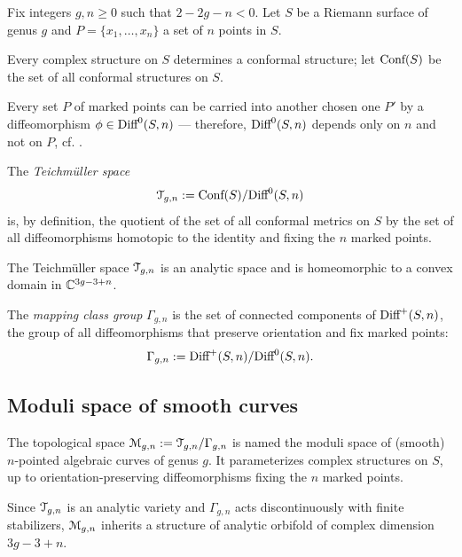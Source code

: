 Fix integers $g,n\geq0$ such that $2 -2g - n < 0$. Let $S$ be a Riemann
surface of genus $g$ and $P = \{ x_1, \ldots, x_n \}$ a set of $n$ points
in $S$.

Every complex structure  on $S$ determines a conformal structure; let
$\text{\rm Conf}(S)$ be the set of all conformal structures on $S$. 

Every set $P$ of marked points can be carried into another chosen one
$P'$ by a diffeomorphism $\phi \in \textrm{Diff}^0(S, n)$ --- therefore,
$\textrm{Diff}^0(S, n)$ depends only on $n$ and not on $P$, cf.
\cite{krushkal;riemann-surfaces}. 
\begin{definition}\label{dfn:teichmuller}
  The \emph{Teichm{\"u}ller space}
  \begin{equation*}
    \mathcal{T}_{g,n} := \text{\rm Conf}(S) / \textrm{Diff}^0(S, n)
  \end{equation*}
  is, by definition, the quotient of the set of all conformal metrics on
  $S$ by the set of all diffeomorphisms homotopic to the identity and
  fixing the $n$ marked points.
\end{definition}
The Teichm{\"u}ller space $\mathcal{T}_{g,n}$ is an analytic space and is
homeomorphic to a convex domain in $\mathbb{C}^{3g - 3 + n}$.

\begin{definition}\label{dfn:mapping-class-group}
  The \emph{mapping class group} $\Gamma_{g,n}$ is the set of connected
  components of $\textrm{Diff}^+(S, n)$, the group of all diffeomorphisms that
  preserve orientation and fix marked points:
  \begin{equation*}
    \Gamma_{g,n} := \textrm{Diff}^+ (S, n) / \textrm{Diff}^0(S, n).
  \end{equation*}
\end{definition}


\subsection{Moduli space of smooth curves}
\label{sec:Mgn}

\begin{definition}
  The topological space $\mathcal{M}_{g,n} := \mathcal{T}_{g,n} / \Gamma_{g,n}$ is named the
  moduli space of (smooth) $n$-pointed algebraic curves of genus $g$.
  It parameterizes complex structures on $S$, up to
  orientation-preserving diffeomorphisms fixing the $n$ marked points.
\end{definition}
Since $\mathcal{T}_{g,n}$ is an analytic variety and $\Gamma_{g,n}$ acts
discontinuously with finite stabilizers, $\mathcal{M}_{g,n}$ inherits a
structure of analytic orbifold of complex dimension $3g - 3 + n$.

